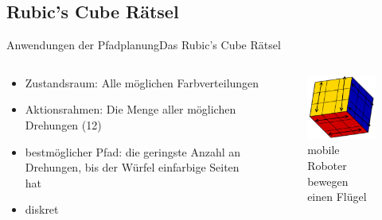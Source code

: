 \documentclass[t,aspectratio=169,dvipsnames]{beamer}
\begin{document}
\subsection{Rubic's Cube Rätsel}
\begin{frame}{Anwendungen der Pfadplanung}{Das Rubic's Cube Rätsel}
	\begin{columns}
		\begin{column}[T]{0.5\textwidth}
				\begin{itemize}
					\item Zustandsraum: Alle möglichen Farbverteilungen
					\item Aktionsrahmen: Die Menge aller möglichen Drehungen (12)
					\item bestmöglicher Pfad: die geringste Anzahl an Drehungen, bis der Würfel einfarbige Seiten hat
					\item diskret
				\end{itemize}
		\end{column}
		\begin{column}[T]{0.5\textwidth}
			\begin{figure}
				\includegraphics[width=4.5cm]{images/img229_a.png}
				\caption{mobile Roboter bewegen einen Flügel} 
			\end{figure}
		\end{column}
	\end{columns}
\end{frame}
\end{document}
